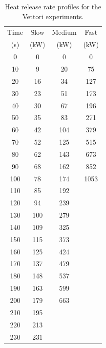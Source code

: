 \begin{table}[h!]
\caption[Heat release rate profiles for the Vettori experiments]{Heat release rate profiles for the Vettori experiments.}
\begin{center}
\begin{tabular}{|c|c|c|c|}
\hline
Time    & Slow     & Medium     & Fast   \\
(s)     & (kW)     & (kW)       & (kW)   \\  \hline \hline
0       & 0        & 0          & 0      \\ \hline 10      & 9        &  20        &  75    \\ \hline
20      & 16       &  34        &  127   \\ \hline
30      &   23     &  51        &  173   \\ \hline
40      &   30     &  67        &  196   \\ \hline
50      &   35     &  83        &  271   \\ \hline
60      &   42     &  104       &  379   \\ \hline
70      &   52     &  125       &  515   \\ \hline
80      &   62     &  143       &  673   \\ \hline
90      &   68     &  162       &  852   \\ \hline
100      &  78      &  174       & 1053   \\ \hline
110      &  85      &  192       &        \\ \hline
120      &  94      &  239       &        \\ \hline
130      &  100     &  279       &        \\ \hline
140      &  109     &  325       &        \\ \hline
150      &  115     &  373       &        \\ \hline
160      &  125     &  424       &        \\ \hline
170      &  137     &  479       &        \\ \hline
180      &  148     &  537       &        \\ \hline
190      &  163     &  599       &        \\ \hline
200      &  179     &  663       &        \\ \hline
210      &  195     &            &        \\ \hline
220      &  213     &            &        \\ \hline
230      &  231     &            &        \\ \hline

\end{tabular}
\end{center}
\end{table}
